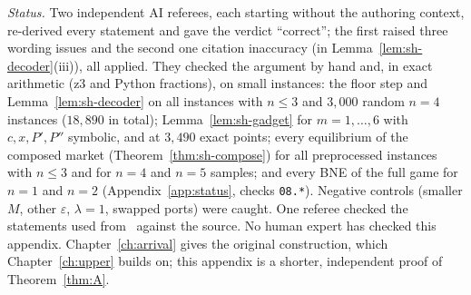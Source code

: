 \emph{Status.} Two independent AI referees, each starting without the authoring context, re-derived
every statement and gave the verdict ``correct''; the first raised three wording issues and the second
one citation inaccuracy (in Lemma~\ref{lem:sh-decoder}(iii)), all applied. They checked the argument by
hand and, in exact arithmetic (z3 and Python fractions), on small instances: the floor step and
Lemma~\ref{lem:sh-decoder} on all instances with $n\le3$ and $3{,}000$ random $n=4$ instances ($18{,}890$ in total);
Lemma~\ref{lem:sh-gadget} for $m=1,\dots,6$ with $c,x,P',P''$ symbolic, and at $3{,}490$ exact points; every
equilibrium of the composed market (Theorem~\ref{thm:sh-compose}) for all preprocessed instances with
$n\le3$ and for $n=4$ and $n=5$ samples; and every BNE of the full game for $n=1$ and $n=2$
(Appendix~\ref{app:status}, checks \texttt{08.*}). Negative controls (smaller $M$, other
$\varepsilon$, $\lambda=1$, swapped ports) were caught. One referee checked the statements used from~\cite[Def.~2, Lemma~1]{dgkmw17} against the source. No human expert has checked this appendix. Chapter~\ref{ch:arrival} gives the original construction, which Chapter~\ref{ch:upper} builds on; this appendix is a shorter, independent proof of Theorem~\ref{thm:A}.
